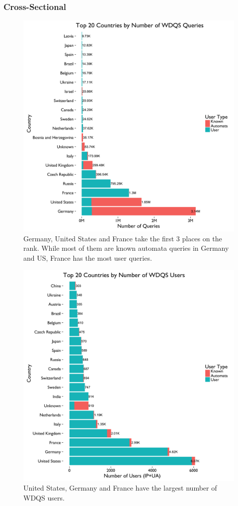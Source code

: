 \documentclass[12pt,]{article}
\begin{document}
\subsubsection{Cross-Sectional}\label{cross-sectional}

\begin{figure}[H]
\centering
\includegraphics{figures/n_query_by_country.png}
\caption{Germany, United States and France take the first 3 places on
the rank. While most of them are known automata queries in Germany and US,
France has the most user queries.}
\end{figure}

\begin{figure}[H]
\centering
\includegraphics{figures/n_user_by_country.png}
\caption{United States, Germany and France have the largest number of
WDQS users.}
\end{figure}
\end{document}
